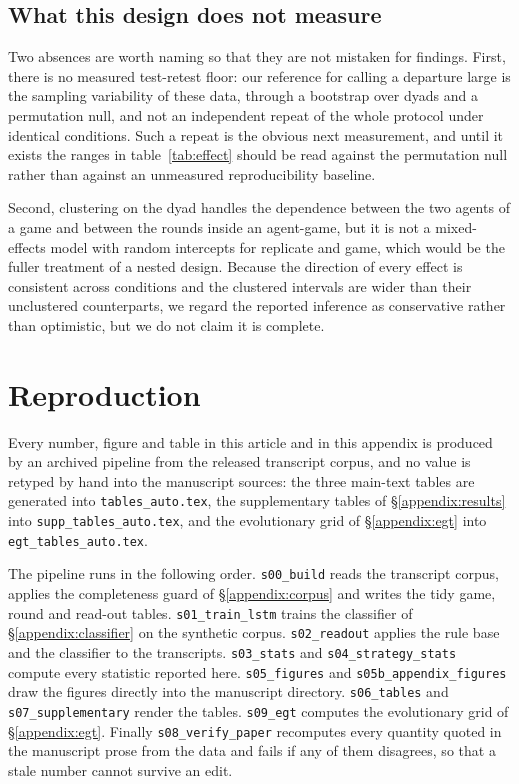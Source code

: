 \documentclass[openacc]{rsproca_new}
\begin{document}
\subsection{What this design does not measure}\label{appendix:robust_gaps}

Two absences are worth naming so that they are not mistaken for findings.
First, there is no measured test-retest floor: our reference for calling a
departure large is the sampling variability of these data, through a bootstrap
over dyads and a permutation null, and not an independent repeat of the whole
protocol under identical conditions. Such a repeat is the obvious next
measurement, and until it exists the ranges in table~\ref{tab:effect} should be
read against the permutation null rather than against an unmeasured
reproducibility baseline.

Second, clustering on the dyad handles the dependence between the two agents of
a game and between the rounds inside an agent-game, but it is not a
mixed-effects model with random intercepts for replicate and game, which would
be the fuller treatment of a nested design. Because the direction of every
effect is consistent across conditions and the clustered intervals are wider
than their unclustered counterparts, we regard the reported inference as
conservative rather than optimistic, but we do not claim it is complete.


\section{Reproduction}\label{appendix:repro}

Every number, figure and table in this article and in this appendix is produced
by an archived pipeline from the released transcript corpus, and no value is
retyped by hand into the manuscript sources: the three main-text tables are
generated into \texttt{tables\_auto.tex}, the supplementary tables of
\S\ref{appendix:results} into \texttt{supp\_tables\_auto.tex}, and the
evolutionary grid of \S\ref{appendix:egt} into \texttt{egt\_tables\_auto.tex}.

The pipeline runs in the following order. \texttt{s00\_build} reads the
transcript corpus, applies the completeness guard of
\S\ref{appendix:corpus} and writes the tidy game, round and read-out tables.
\texttt{s01\_train\_lstm} trains the classifier of \S\ref{appendix:classifier}
on the synthetic corpus. \texttt{s02\_readout} applies the rule base and the
classifier to the transcripts. \texttt{s03\_stats} and
\texttt{s04\_strategy\_stats} compute every statistic reported here.
\texttt{s05\_figures} and \texttt{s05b\_appendix\_figures} draw the figures
directly into the manuscript directory. \texttt{s06\_tables} and
\texttt{s07\_supplementary} render the tables. \texttt{s09\_egt} computes the
evolutionary grid of \S\ref{appendix:egt}. Finally \texttt{s08\_verify\_paper}
recomputes every quantity quoted in the manuscript prose from the data and
fails if any of them disagrees, so that a stale number cannot survive an edit.
\end{document}
